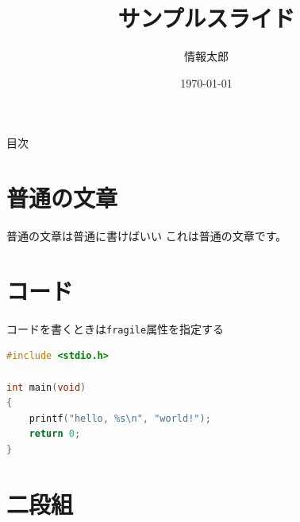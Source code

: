 \documentclass[unicode,12pt]{beamer}
\title{サンプルスライド}
\author{情報太郎}
\date{\today}
\begin{document}
\begin{frame}
  \titlepage
\end{frame}

\begin{frame}{目次}
  \tableofcontents
\end{frame}

\section{普通の文章}

\begin{frame}{普通の文章は普通に書けばいい}
これは普通の文章です。
\end{frame}

\section{コード}

\begin{frame}[fragile]{コードを書くときは\texttt{fragile}属性を指定する}
\begin{lstlisting}[language=c,caption=サンプルコード,label=code:sample]
#include <stdio.h>

int main(void)
{
    printf("hello, %s\n", "world!");
    return 0;
}
\end{lstlisting}
\end{frame}

\section{二段組}
\end{document}
